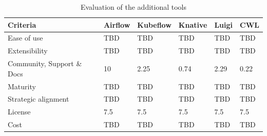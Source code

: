 \begin{table}[htb]
    \centering
    \begin{tabular}{|l|l|l|l|l|l|} \hline
        \textbf{Criteria}                                          & \textbf{Airflow}      & \textbf{Kubeflow}     & \textbf{Knative}      & \textbf{Luigi}        & \textbf{CWL}          \\ \hline
        Ease of use                                                & TBD                   & TBD                   & TBD                   & TBD                   & TBD                   \\ \hline
        Extensibility                                              & TBD                   & TBD                   & TBD                   & TBD                   & TBD                   \\ \hline
        Community, Support \& Docs                                 & 10                    & 2.25                  & 0.74                  & 2.29                  & 0.22                  \\ \hline
        Maturity                                                   & TBD                   & TBD                   & TBD                   & TBD                   & TBD                   \\ \hline
        Strategic alignment                                        & TBD                   & TBD                   & TBD                   & TBD                   & TBD                   \\ \hline
        License                                                    & 7.5                     & 7.5                     & 7.5                     & 7.5                     & 7.5                     \\ \hline
        Cost                                                       & TBD                   & TBD                   & TBD                   & TBD                   & TBD                   \\ \hline

    \end{tabular}
    \caption{Evaluation of the additional tools}
    \label{tab:evaluation_of_the_additional_tools}
\end{table}


\newpage
{}

\label{appendix:pipeline_communication_sld}

